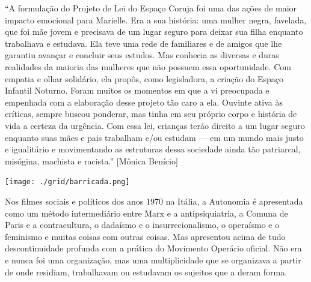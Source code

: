 \medskip

\noindent{}“A formulação do Projeto de Lei do Espaço Coruja foi uma das ações de maior impacto emocional para Marielle. Era a sua história: uma mulher negra, favelada, que foi mãe jovem e precisava de um lugar seguro para deixar sua filha enquanto trabalhava e estudava. Ela teve uma rede de familiares e de amigos que lhe garantiu avançar e concluir seus estudos. Mas conhecia as diversas e duras realidades da maioria das mulheres que não possuem essa oportunidade. Com empatia e olhar solidário, ela propôs, como legisladora, a criação do Espaço Infantil Noturno. Foram muitos os momentos em que a vi preocupada e empenhada com a elaboração desse projeto tão caro a ela. Ouvinte ativa às críticas, sempre buscou ponderar, mas tinha em seu próprio corpo e história de vida a certeza da urgência. Com essa lei, crianças terão direito a um lugar seguro enquanto suas mães e pais trabalham e/ou estudam --- em um mundo mais justo e igualitário e movimentando as estruturas dessa sociedade ainda tão patriarcal, misógina, machista e racista.” [Mônica Benício]


\vfill

\hspace*{-.4cm}\begin{minipage}[c]{.5\linewidth}
\small{
{}}
\end{minipage}

\pagebreak %

\begin{center}
\hspace*{.5cm}\texttt{[image: ./grid/barricada.png]}
\end{center}

\hspace*{-7cm}\hrulefill\hspace*{-7cm}

\medskip

\noindent{}Nos filmes sociais e políticos dos anos 1970 na Itália, a Autonomia é apresentada como um método intermediário entre Marx e a antipsiquiatria, a Comuna de Paris e a contracultura, o dadaísmo e o insurrecionalismo, o operaísmo e o feminismo e muitas coisas com outras coisas. Mas apresentou acima de tudo descontinuidade profunda com a prática do Movimento Operário oficial. Não era e nunca foi uma organização, mas uma multiplicidade que se organizava a partir de onde residiam, trabalhavam ou estudavam os sujeitos que a deram forma.


